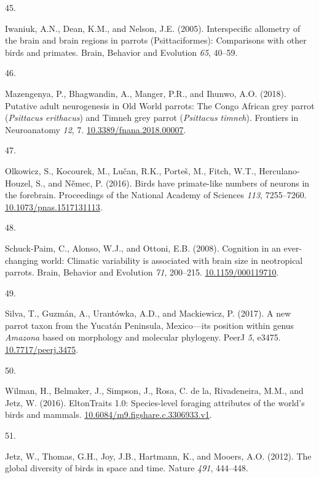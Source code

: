 \documentclass[
  man, donotrepeattitle,floatsintext]{apa6}
\newlength{\cslhangindent}
\newlength{\csllabelwidth}
\newlength{\cslentryspacingunit} %
\newenvironment{CSLReferences}[2] %
 {%
  \setlength{\parindent}{0pt}
  \ifodd #1
  \let\oldpar\par
  \def\par{\hangindent=\cslhangindent\oldpar}
  \fi
  \setlength{\parskip}{#2\cslentryspacingunit}
 }%
 {}
\newcommand{\CSLLeftMargin}[1]{\parbox[t]{\csllabelwidth}{#1}}
\newcommand{\CSLRightInline}[1]{\parbox[t]{\linewidth - \csllabelwidth}{#1}\break}
\begin{document}
\begin{CSLReferences}{0}{0}
\leavevmode{}%
\CSLLeftMargin{45. }%
\CSLRightInline{Iwaniuk, A.N., Dean, K.M., and Nelson, J.E. (2005). Interspecific allometry of the brain and brain regions in parrots ({P}sittaciformes): Comparisons with other birds and primates. Brain, Behavior and Evolution \emph{65}, 40--59.}

\leavevmode{}%
\CSLLeftMargin{46. }%
\CSLRightInline{Mazengenya, P., Bhagwandin, A., Manger, P.R., and Ihunwo, A.O. (2018). Putative adult neurogenesis in {O}ld {W}orld parrots: The {C}ongo {A}frican grey parrot (\emph{{P}sittacus erithacus}) and {T}imneh grey parrot (\emph{{P}sittacus timneh}). Frontiers in Neuroanatomy \emph{12}, 7. \href{https://doi.org/10.3389/fnana.2018.00007}{10.3389/fnana.2018.00007}.}

\leavevmode{}%
\CSLLeftMargin{47. }%
\CSLRightInline{Olkowicz, S., Kocourek, M., Lučan, R.K., Porteš, M., Fitch, W.T., Herculano-Houzel, S., and Němec, P. (2016). Birds have primate-like numbers of neurons in the forebrain. Proceedings of the National Academy of Sciences \emph{113}, 7255--7260. \href{https://doi.org/10.1073/pnas.1517131113}{10.1073/pnas.1517131113}.}

\leavevmode{}%
\CSLLeftMargin{48. }%
\CSLRightInline{Schuck-Paim, C., Alonso, W.J., and Ottoni, E.B. (2008). Cognition in an ever-changing world: Climatic variability is associated with brain size in neotropical parrots. Brain, Behavior and Evolution \emph{71}, 200--215. \href{https://doi.org/10.1159/000119710}{10.1159/000119710}.}

\leavevmode{}%
\CSLLeftMargin{49. }%
\CSLRightInline{Silva, T., Guzmán, A., Urantówka, A.D., and Mackiewicz, P. (2017). A new parrot taxon from the {Y}ucat{á}n {P}eninsula, {M}exico---its position within genus \emph{{A}mazona} based on morphology and molecular phylogeny. PeerJ \emph{5}, e3475. \href{https://doi.org/10.7717/peerj.3475}{10.7717/peerj.3475}.}

\leavevmode{}%
\CSLLeftMargin{50. }%
\CSLRightInline{Wilman, H., Belmaker, J., Simpson, J., Rosa, C. de la, Rivadeneira, M.M., and Jetz, W. (2016). EltonTraits 1.0: Species-level foraging attributes of the world's birds and mammals. \href{https://doi.org/10.6084/m9.figshare.c.3306933.v1}{10.6084/m9.figshare.c.3306933.v1}.}

\leavevmode{}%
\CSLLeftMargin{51. }%
\CSLRightInline{Jetz, W., Thomas, G.H., Joy, J.B., Hartmann, K., and Mooers, A.O. (2012). The global diversity of birds in space and time. Nature \emph{491}, 444--448.}


\end{CSLReferences}
\end{document}
